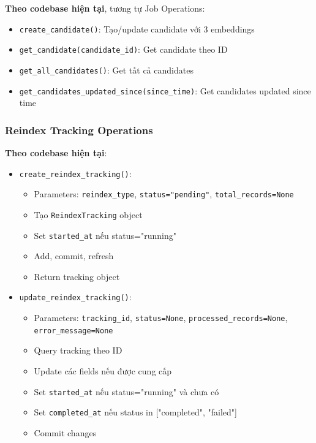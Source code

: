 \textbf{Theo codebase hiện tại}, tương tự Job Operations:
\begin{itemize}
    \item \texttt{create\_candidate()}: Tạo/update candidate với 3 embeddings
    \item \texttt{get\_candidate(candidate\_id)}: Get candidate theo ID
    \item \texttt{get\_all\_candidates()}: Get tất cả candidates
    \item \texttt{get\_candidates\_updated\_since(since\_time)}: Get candidates updated since time
\end{itemize}

\subsubsection{Reindex Tracking Operations}

\textbf{Theo codebase hiện tại}:
\begin{itemize}
    \item \texttt{create\_reindex\_tracking()}:
    \begin{itemize}
        \item Parameters: \texttt{reindex\_type}, \texttt{status="pending"}, \texttt{total\_records=None}
        \item Tạo \texttt{ReindexTracking} object
        \item Set \texttt{started\_at} nếu status="running"
        \item Add, commit, refresh
        \item Return tracking object
    \end{itemize}
    \item \texttt{update\_reindex\_tracking()}:
    \begin{itemize}
        \item Parameters: \texttt{tracking\_id}, \texttt{status=None}, \texttt{processed\_records=None}, \texttt{error\_message=None}
        \item Query tracking theo ID
        \item Update các fields nếu được cung cấp
        \item Set \texttt{started\_at} nếu status="running" và chưa có
        \item Set \texttt{completed\_at} nếu status in ["completed", "failed"]
        \item Commit changes
    \end{itemize}
\end{itemize}

